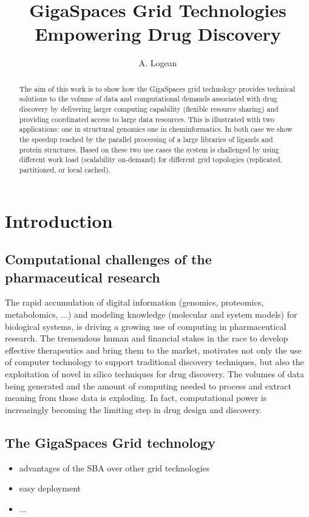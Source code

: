 \documentclass[a4paper,10pt]{article}
\title{GigaSpaces Grid Technologies Empowering
Drug Discovery}
\author{A. Logean}
\begin{document}
\maketitle

\begin{abstract}
The aim of this work is to show how the GigaSpaces grid technology provides technical solutions to the volume of data and computational demands associated with drug discovery by delivering larger computing capability (flexible resource sharing) and providing coordinated access to large data resources. This is illustrated with two applications: one in structural genomics one in cheminformatics. In both case we show the speedup reached by the parallel processing of a large libraries of ligands and protein structures. Based on these two use cases the system is challenged by using different work load (scalability on-demand) for different grid topologies (replicated, partitioned, or local cached). 
\end{abstract}

\section{Introduction}
\subsection{Computational challenges of the pharmaceutical research}

The rapid accumulation of digital information (genomics, proteomics, metabolomics, ...) and modeling knowledge (molecular and system models)  for biological systems, is driving a growing use of computing in pharmaceutical research. The tremendous human and financial stakes in the race to develop effective therapeutics and bring them to the market, motivates not only the use of computer technology to support traditional discovery techniques, but also the exploitation of novel in silico techniques for drug discovery. The volumes of data being generated and the amount of computing needed to process and extract meaning from those data is exploding. In fact, computational power is increasingly becoming the limiting step in drug design and discovery.

\subsection{The GigaSpaces Grid technology}
\begin{itemize}
 \item advantages of the SBA over other grid technologies
 \item easy deployment
 \item ...
\end{itemize}
\end{document}
